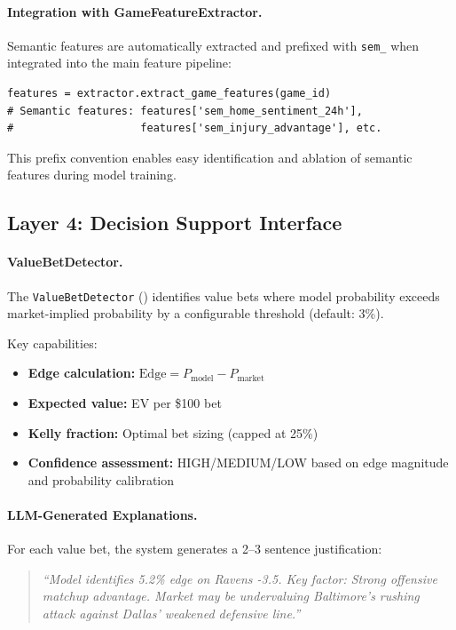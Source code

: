 \paragraph{Integration with GameFeatureExtractor.}
Semantic features are automatically extracted and prefixed with \texttt{sem\_} when integrated into the main feature pipeline:

\begin{verbatim}
features = extractor.extract_game_features(game_id)
# Semantic features: features['sem_home_sentiment_24h'],
#                    features['sem_injury_advantage'], etc.
\end{verbatim}

This prefix convention enables easy identification and ablation of semantic features during model training.

\subsection{Layer 4: Decision Support Interface}

\paragraph{ValueBetDetector.}
The \texttt{ValueBetDetector} () identifies value bets where model probability exceeds market-implied probability by a configurable threshold (default: 3\%).

Key capabilities:

\begin{itemize}[itemsep=2pt,parsep=0pt]
    \item \textbf{Edge calculation:} $\text{Edge} = P_{\text{model}} - P_{\text{market}}$
    \item \textbf{Expected value:} EV per \$100 bet
    \item \textbf{Kelly fraction:} Optimal bet sizing (capped at 25\%)
    \item \textbf{Confidence assessment:} HIGH/MEDIUM/LOW based on edge magnitude and probability calibration
\end{itemize}

\paragraph{LLM-Generated Explanations.}
For each value bet, the system generates a 2--3 sentence justification:

\begin{quote}
\textit{``Model identifies 5.2\% edge on Ravens -3.5. Key factor: Strong offensive matchup advantage. Market may be undervaluing Baltimore's rushing attack against Dallas' weakened defensive line.''}
\end{quote}

